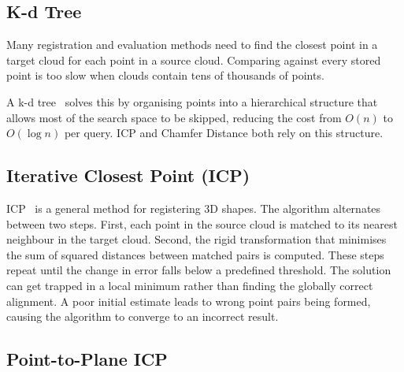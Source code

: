 \subsection{K-d Tree}
\label{sec:kdtree}


Many registration and evaluation methods need to find the closest point in a
target cloud for each point in a source cloud. Comparing against every stored
point is too slow when clouds contain tens of thousands of points.

A k-d tree~\cite{bentley1975kdtree} solves this by organising points into a
hierarchical structure that allows most of the search space to be skipped,
reducing the cost from $O(n)$ to $O(\log n)$ per query.
ICP and Chamfer Distance both rely on this structure.

\subsection{Iterative Closest Point (ICP)}

ICP~\cite{besl1992icp} is a general method for registering 3D shapes.
The algorithm alternates between two steps.
First, each point in the source cloud is matched to its nearest neighbour in
the target cloud.
Second, the rigid transformation that minimises the sum of squared distances
between matched pairs is computed.
These steps repeat until the change in error falls below a predefined threshold.
The solution can get trapped in a local minimum rather than finding the globally
correct alignment.
A poor initial estimate leads to wrong point pairs being formed, causing the
algorithm to converge to an incorrect result.

\subsection{Point-to-Plane ICP}

